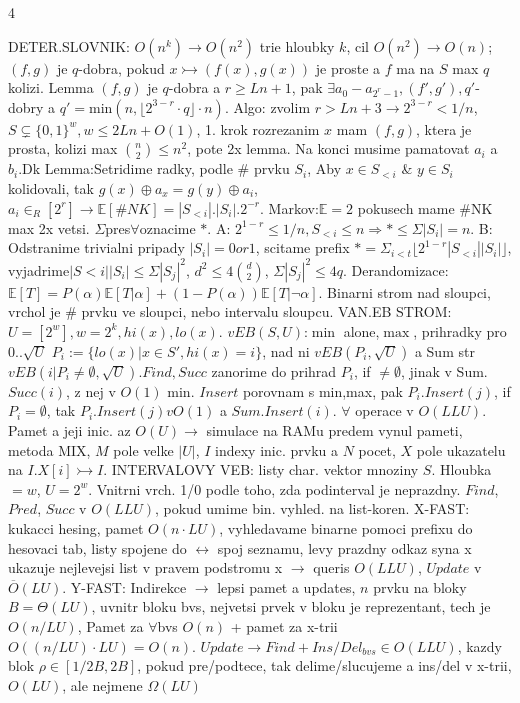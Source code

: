 \documentclass[8pt]{extarticle}
\begin{document}
\fontsize{4.8pt}{5.2pt}\selectfont 
\begin{multicols*}{4} %

DETER.SLOVNIK: $O(n^k)\rightarrow O(n^2)$ trie hloubky $k$, cil $O(n^2)\rightarrow O(n)$;$(f,g)$ je $q$-dobra, pokud $x \rightarrowtail (f(x),g(x))$ je proste a $f$ ma na $S$ max $q$ kolizi. Lemma $(f,g)$ je $q$-dobra a $r\geq Ln+1$, pak $\exists a_0-a_{2^r-1}, (f',g'), q'$-dobry a $q' = \text{min}(n, \lfloor 2^{3-r} \cdot q \rfloor \cdot n)$. Algo: zvolim $r > Ln +3 \rightarrow 2^{3-r}<1/n$, $S\subsetneq\{{0,1}\}^w, w\leq2Ln+O(1)$, 1. krok rozrezanim $x$ mam $(f,g)$, ktera je prosta, kolizi max $\binom{n}{2} \leq n^2$, pote 2x lemma. Na konci musime pamatovat $a_i$ a $b_i$.Dk Lemma:Setridime radky, podle \# prvku $S_i$, Aby $x \in S_{<i}$ \& $y \in S_i$ kolidovali, tak $g(x) \oplus a_x = g(y) \oplus a_i$, $a_i \in_R [2^r] \rightarrow \mathbb{E}[\#NK] = |S_{<i}|.|S_i|.2^{-r}$. Markov:$\mathbb{E}=2$ pokusech mame \#NK max 2x vetsi. $\Sigma$pres$\forall$oznacime $*$. A: $2^{1-r}\leq 1/n, S_{<i}\leq n \Rightarrow *\leq \Sigma |S_i| = n$. B: Odstranime trivialni pripady $|S_i|=0 or 1$, scitame prefix $* = \Sigma_{i<t}\lfloor 2^{1-r}|S_{<i}||S_i|\rfloor$, vyjadrime$|S{<i}||S_i|\leq \Sigma|S_j|^2$, $d^2 \leq 4\binom{d}{2}$, $\Sigma|S_j|^2 \leq 4q$. Derandomizace: $\mathbb{E}[T]=P(\alpha)\mathbb{E}[T|\alpha] + (1-P(\alpha))\mathbb{E}[T|\neg\alpha]$. Binarni strom nad sloupci, vrchol je \# prvku ve sloupci, nebo intervalu sloupcu. VAN.EB STROM:$U=[2^w],w=2^k,hi(x),lo(x)$. $vEB(S,U)$:$\min$ alone,$\max$, prihradky pro $0..\sqrt{U}$ $P_i:=\{lo(x)|x\in S', hi(x)=i\}$, nad ni $vEB(P_i, \sqrt{U})$ a Sum str $vEB({i|P_i\neq\emptyset}, \sqrt{U})$.$Find, Succ$ zanorime do prihrad $P_i$, if $\neq\emptyset$, jinak v Sum.$Succ(i)$, z nej v $O(1)$ min. $Insert$ porovnam s min,max, pak $P_i.Insert(j)$, if$P_i = \emptyset$, tak $P_i.Insert(j) v O(1)$ a $Sum.Insert(i)$. $\forall$ operace v $O(LLU)$. Pamet a jeji inic. az $O(U) \rightarrow$ simulace na RAMu predem vynul pameti, metoda MIX, $M$ pole velke $|U|$, $I$ indexy inic. prvku a $N$ pocet, $X$ pole ukazatelu na $I$.$X[i]\rightarrowtail I$. INTERVALOVY VEB: listy char. vektor mnoziny $S$. Hloubka$=w$, $U=2^w$. Vnitrni vrch. 1/0 podle toho, zda podinterval je neprazdny. $Find$, $Pred$, $Succ$ v $O(LLU)$, pokud umime bin. vyhled. na list-koren. X-FAST:  kukacci hesing, pamet $O(n\cdot LU)$, vyhledavame binarne pomoci prefixu do hesovaci tab, listy spojene do $\leftrightarrow$ spoj seznamu, levy prazdny odkaz syna x ukazuje nejlevejsi list v pravem podstromu x $\rightarrow$ queris $O(LLU)$, $Update$ v $\overline{O}(LU)$. Y-FAST: Indirekce $\rightarrow$ lepsi pamet a updates, $n$ prvku na bloky $B=\Theta(LU)$, uvnitr bloku bvs, nejvetsi prvek v bloku je reprezentant, tech je $O(n/LU)$, Pamet za $\forall$bvs $O(n)$ + pamet za x-trii $O((n/LU)\cdot LU)=O(n)$. $Update \rightarrow Find + Ins/Del_{bvs} \in O(LLU)$, kazdy blok $\rho\in[1/2B, 2B]$, pokud pre/podtece, tak delime/slucujeme a ins/del v x-trii, $O(LU)$, ale nejmene $\Omega(LU)$ 
\end{multicols*}
\end{document}
